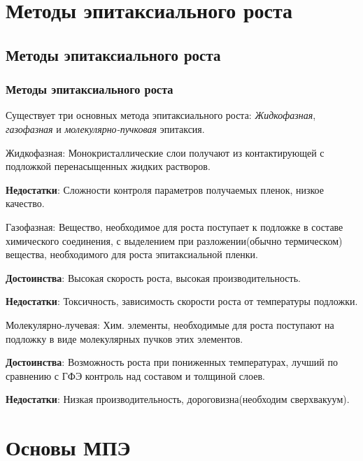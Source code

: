 \documentclass[10pt,pdf,hyperref={unicode}, dvipsnames]{beamer}
\begin{document}
\section{Методы эпитаксиального роста}
\subsection{Методы эпитаксиального роста}
\begin{frame}[t]
	\frametitle{Методы эпитаксиального роста}
	Существует три основных метода эпитаксиального роста: \textit{Жидкофазная}, \textit{газофазная} и
	\textit{молекулярно-пучковая} эпитаксия.
	\vspace{10pt}

	Жидкофазная: Монокристаллические слои получают из контактирующей с подложкой перенасыщенных жидких растворов.

	\textbf{Недостатки}: Сложности контроля параметров получаемых пленок, низкое качество. 
	\vspace{10pt}

	Газофазная: Вещество, необходимое для роста поступает к подложке в составе химического соединения, с выделением при
	разложении(обычно термическом) вещества, необходимого для роста эпитаксиальной пленки.

	\textbf{Достоинства}: Высокая скорость роста, высокая производительность.

	\textbf{Недостатки}: Токсичность, зависимость скорости роста от температуры подложки.
	\vspace{10pt}

	Молекулярно-лучевая: Хим. элементы, необходимые для роста поступают на подложку в виде молекулярных пучков этих
	элементов.
	
	\textbf{Достоинства}: Возможность роста при пониженных температурах, лучший по сравнению с ГФЭ контроль над составом и
	толщиной слоев.

	\textbf{Недостатки}: Низкая производительность, дороговизна(необходим сверхвакуум).
\end{frame}

\section{Основы МПЭ}
\end{document}
